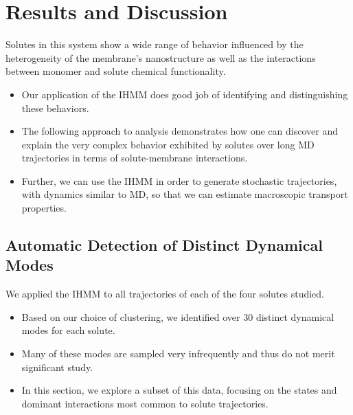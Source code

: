 \documentclass{article}
\begin{document}
  \section{Results and Discussion}
  
  Solutes in this system show a wide range of behavior influenced by the 
  heterogeneity of the membrane's nanostructure as well as the interactions 
  between monomer and solute chemical functionality. 
  \begin{itemize}  
  	\item Our application of the IHMM does  good job of identifying and
  	distinguishing these behaviors.   	
  	\item The following approach to analysis demonstrates how one can discover and explain the very complex behavior exhibited by solutes over long MD trajectories 
   in terms of solute-membrane interactions.
	\item Further, we can use the IHMM in order to generate stochastic trajectories,
	with dynamics similar to MD, so that we can estimate macroscopic transport
	properties.
  \end{itemize}  	

  \subsection{Automatic Detection of Distinct Dynamical Modes}\label{section:find_modes}
  
  
  We applied the IHMM to all trajectories of each of the four solutes studied.
  \begin{itemize}
    \item Based on our choice of clustering, we identified over 30 distinct dynamical
    modes for each solute.
    \item Many of these modes are sampled very infrequently and thus do not merit significant study.
    \item In this section, we explore a subset of this data, focusing on the states
    and dominant interactions most common to solute trajectories. 
  \end{itemize}  
\end{document}
